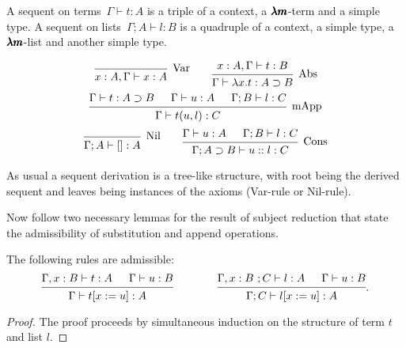 \begin{definition}[Sequent]
  A sequent on terms~$\Gamma \vdash t:A$ is a triple of a context, a $\pmb{\lambda m}$-term and a simple type.
  A sequent on lists~$\Gamma;A \vdash l:B$ is a quadruple of a context, a simple type, a $\pmb{\lambda m}$-list and another simple type.
\end{definition}


\begin{definition}
  \[
    \begin{prooftree}
      \infer0[Var]{ x:A, \Gamma \vdash x:A } 
    \end{prooftree}
    \qquad
    \begin{prooftree}
      \hypo{ x:A, \Gamma \vdash t:B }
      \infer1[Abs]{ \Gamma \vdash \lambda x . t : A \supset B  } 
    \end{prooftree}
  \]
  \[
    \begin{prooftree}
      \hypo{ \Gamma \vdash t : A \supset B }
      \hypo{ \Gamma \vdash u : A }
      \hypo{ \Gamma ; B \vdash l : C }	
      \infer3[mApp]{ \Gamma \vdash t(u, l) : C } 
    \end{prooftree}
  \]
  \[
    \begin{prooftree}
      \infer0[Nil]{ \Gamma ; A \vdash []:A } 
    \end{prooftree}
    \qquad
    \begin{prooftree}
      \hypo{ \Gamma \vdash u:A }
      \hypo{ \Gamma ; B \vdash l:C }
      \infer2[Cons]{ \Gamma ; A \supset B \vdash  u::l : C } 
    \end{prooftree}
  \]
\end{definition}

As usual a sequent derivation is a tree-like structure, with root being the derived sequent and leaves being instances of the axioms (Var-rule or Nil-rule).


Now follow two necessary lemmas for the result of subject reduction that state the admissibility of substitution and append operations.

\begin{lemma}
  \label{type_substitution}
  The following rules are admissible:
  \[
    \begin{prooftree}
      \hypo{ \Gamma , x:B \vdash t:A }
      \hypo{ \Gamma \vdash u:B }
      \infer2{ \Gamma \vdash  t[x := u] : A }      
    \end{prooftree}
    \qquad \qquad
    \begin{prooftree}
      \hypo{ \Gamma , x:B \ ; C \vdash l:A }
      \hypo{ \Gamma \vdash u:B }
      \infer2{ \Gamma ; C \vdash  l[x := u] : A }
    \end{prooftree}.
  \]
\end{lemma}
\begin{proof}
  The proof proceeds by simultaneous induction on the structure of term $t$ and list $l$.
\end{proof}

